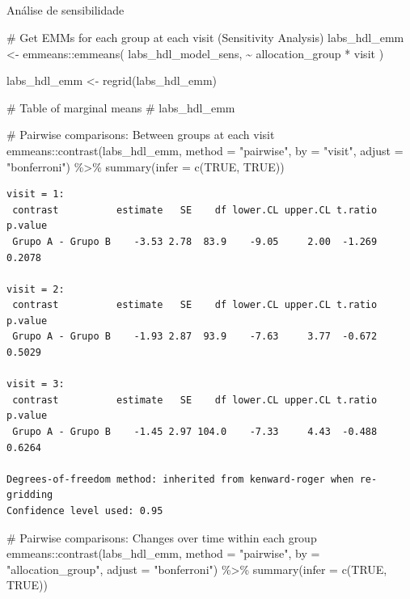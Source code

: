 \documentclass[
  12pt,
]{article}
\makeatletter
\let\oldsubparagraph\subparagraph
\renewcommand{\subparagraph}{
    \@ifstar
      \xxxSubParagraphStar
      \xxxSubParagraphNoStar
  }
\newcommand{\xxxSubParagraphStar}[1]{\oldsubparagraph*{#1}\mbox{}}
\newcommand{\xxxSubParagraphNoStar}[1]{\oldsubparagraph{#1}\mbox{}}
\newenvironment{Shaded}{\begin{snugshade}}{\end{snugshade}}
\newcommand{\AttributeTok}[1]{\textcolor[rgb]{0.40,0.45,0.13}{#1}}
\newcommand{\CommentTok}[1]{\textcolor[rgb]{0.37,0.37,0.37}{#1}}
\newcommand{\ConstantTok}[1]{\textcolor[rgb]{0.56,0.35,0.01}{#1}}
\newcommand{\FunctionTok}[1]{\textcolor[rgb]{0.28,0.35,0.67}{#1}}
\newcommand{\NormalTok}[1]{\textcolor[rgb]{0.00,0.23,0.31}{#1}}
\newcommand{\OtherTok}[1]{\textcolor[rgb]{0.00,0.23,0.31}{#1}}
\newcommand{\SpecialCharTok}[1]{\textcolor[rgb]{0.37,0.37,0.37}{#1}}
\newcommand{\StringTok}[1]{\textcolor[rgb]{0.13,0.47,0.30}{#1}}
\makeatother
\begin{document}
\subparagraph{Análise de
sensibilidade}\label{anuxe1lise-de-sensibilidade-6}

\begin{Shaded}
\begin{Highlighting}[]
\CommentTok{\# Get EMMs for each group at each visit (Sensitivity Analysis)}
\NormalTok{labs\_hdl\_emm }\OtherTok{\textless{}{-}}\NormalTok{ emmeans}\SpecialCharTok{::}\FunctionTok{emmeans}\NormalTok{(}
\NormalTok{    labs\_hdl\_model\_sens, }
    \SpecialCharTok{\textasciitilde{}}\NormalTok{ allocation\_group }\SpecialCharTok{*}\NormalTok{ visit}
\NormalTok{)}

\NormalTok{labs\_hdl\_emm }\OtherTok{\textless{}{-}} \FunctionTok{regrid}\NormalTok{(labs\_hdl\_emm)}

\CommentTok{\# Table of marginal means}
\CommentTok{\# labs\_hdl\_emm}

\CommentTok{\# Pairwise comparisons: Between groups at each visit}
\NormalTok{emmeans}\SpecialCharTok{::}\FunctionTok{contrast}\NormalTok{(labs\_hdl\_emm,}
\AttributeTok{method =} \StringTok{"pairwise"}\NormalTok{, }\AttributeTok{by =} \StringTok{"visit"}\NormalTok{,}
\AttributeTok{adjust =} \StringTok{"bonferroni"}\NormalTok{) }\SpecialCharTok{\%\textgreater{}\%} \FunctionTok{summary}\NormalTok{(}\AttributeTok{infer =} \FunctionTok{c}\NormalTok{(}\ConstantTok{TRUE}\NormalTok{, }\ConstantTok{TRUE}\NormalTok{))}
\end{Highlighting}
\end{Shaded}

\begin{verbatim}
visit = 1:
 contrast          estimate   SE    df lower.CL upper.CL t.ratio p.value
 Grupo A - Grupo B    -3.53 2.78  83.9    -9.05     2.00  -1.269  0.2078

visit = 2:
 contrast          estimate   SE    df lower.CL upper.CL t.ratio p.value
 Grupo A - Grupo B    -1.93 2.87  93.9    -7.63     3.77  -0.672  0.5029

visit = 3:
 contrast          estimate   SE    df lower.CL upper.CL t.ratio p.value
 Grupo A - Grupo B    -1.45 2.97 104.0    -7.33     4.43  -0.488  0.6264

Degrees-of-freedom method: inherited from kenward-roger when re-gridding 
Confidence level used: 0.95 
\end{verbatim}

\begin{Shaded}
\begin{Highlighting}[]
\CommentTok{\# Pairwise comparisons: Changes over time within each group}
\NormalTok{emmeans}\SpecialCharTok{::}\FunctionTok{contrast}\NormalTok{(labs\_hdl\_emm,}
\AttributeTok{method =} \StringTok{"pairwise"}\NormalTok{, }\AttributeTok{by =} \StringTok{"allocation\_group"}\NormalTok{,}
\AttributeTok{adjust =} \StringTok{"bonferroni"}\NormalTok{) }\SpecialCharTok{\%\textgreater{}\%} \FunctionTok{summary}\NormalTok{(}\AttributeTok{infer =} \FunctionTok{c}\NormalTok{(}\ConstantTok{TRUE}\NormalTok{, }\ConstantTok{TRUE}\NormalTok{))}
\end{Highlighting}
\end{Shaded}
\end{document}
